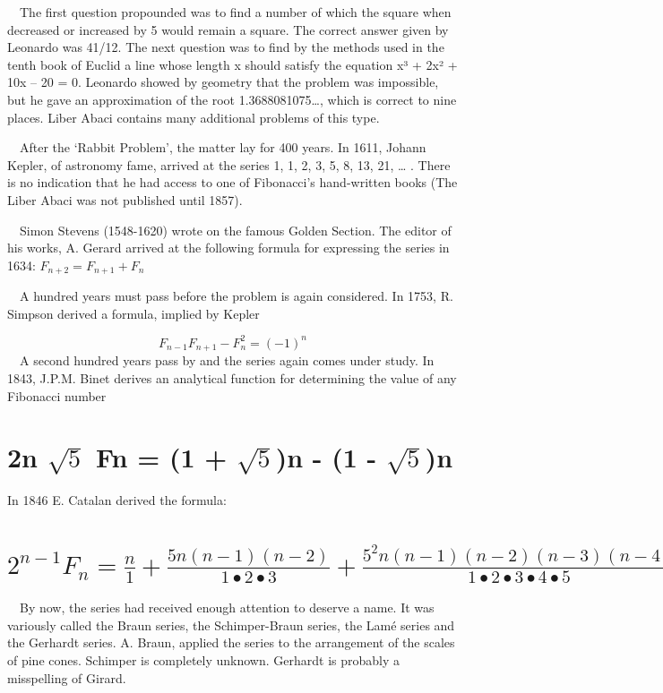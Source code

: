 \documentclass{article}
\begin{document}
\ \ The first question propounded was to find a number of which the square when decreased or increased by 5 would remain
a square. The correct answer given by Leonardo was 41/12. The next question was to find by the methods used in the
tenth book of Euclid a line whose length x should satisfy the equation x³ + 2x² + 10x – 20 = 0. Leonardo showed by
geometry that the problem was impossible, but he gave an approximation of the root 1.3688081075…, which is correct to
nine places. Liber Abaci contains many additional problems of this type.

\ \ After the ‘Rabbit Problem’, the matter lay for 400 years. In 1611, Johann Kepler, of astronomy fame, arrived at the
series 1, 1, 2, 3, 5, 8, 13, 21, … . There is no indication that he had access to one of Fibonacci’s hand-written books
(The Liber Abaci was not published until 1857).

\ \ Simon Stevens (1548-1620) wrote on the famous Golden Section. The editor of his works, A. Gerard arrived at the
following formula for expressing the series in 1634:  $F_{n+2}=F_{n+1}+F_n$

\ \ A hundred years must pass before the problem is again considered. In 1753, R. Simpson derived a formula, implied by
Kepler

\begin{equation*}
F_{n-1}F_{n+1}-F_n^2=\left(-1\right)^n
\end{equation*}
\ \ A second hundred years pass by and the series again comes under study. In 1843, J.P.M. Binet derives an analytical
function for determining the value of any Fibonacci number

\section[2n Fn = (1 +)n {}- (1 {}- )n]{2n $\sqrt 5$ Fn = (1 + $\sqrt 5$)n - (1 -  $\sqrt 5$)n}
In 1846 E. Catalan derived the formula:

\section[]{ $2^{n-1}F_n=\frac n
1+\frac{5n\left(n-1\right)\left(n-2\right)}{1{\bullet}2{\bullet}3}+\frac{5^2n\left(n-1\right)\left(n-2\right)\left(n-3\right)\left(n-4\right)}{1{\bullet}2{\bullet}3{\bullet}4{\bullet}5}$
}
\ \ By now, the series had received enough attention to deserve a name. It was variously called the Braun series, the
Schimper-Braun series, the Lamé series and the Gerhardt series. A. Braun, applied the series to the arrangement of the
scales of pine cones. Schimper is completely unknown. Gerhardt is probably a misspelling of Girard. 
\end{document}
